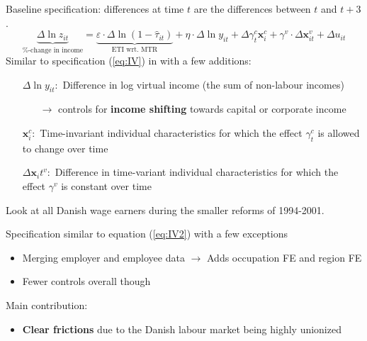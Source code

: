 \documentclass[8pt]{beamer}
\begin{document}
\begin{frame}{\citet{kleven2014estimating}}
  Baseline specification: differences at time $t$ are the differences between $t$ and $t+3$.
  \begin{equation}
    \underbrace{\Delta\ln z_{it}}_\text{\%-change in income} = \underbrace{\varepsilon\cdot\Delta\ln(1-\hat{\tau}_{it})}_\text{ETI wrt. MTR} + \eta\cdot\Delta\ln y_{it} + \Delta\gamma_t^c \bm{x}_i^c + \gamma^v\cdot\Delta\bm{x}_{it}^v + \Delta u_{it}
    \label{eq:IV2}
  \end{equation}
  Similar to specification (\ref{eq:IV}) in \citep{gruber2002elasticity} with a few additions:
  \begin{itemize}
    \item[$\Delta \ln y_{it}:$] Difference in log virtual income (the sum of non-labour incomes)
    \begin{itemize}
      \item[$\rightarrow$] controls for \textbf{income shifting} towards capital or corporate income
    \end{itemize}
    \item[$\bm{x}_i^c:$] Time-invariant individual characteristics for which the effect $\gamma_t^c$ is allowed to change over time
    \item[$\Delta \bm{x}_it^v:$] Difference in time-variant individual characteristics for which the effect $\gamma^v$ is constant over time
  \end{itemize}
\end{frame}


\begin{frame}{\citet{chetty2011adjustment}}
  Look at all Danish wage earners during the smaller reforms of 1994-2001.

  Specification similar to equation (\ref{eq:IV2}) \citep{kleven2014estimating} with a few exceptions
  \begin{itemize}
    \item Merging employer and employee data $\rightarrow$ Adds occupation FE and region FE
    \item Fewer controls overall though
  \end{itemize}
  Main contribution:
  \begin{itemize}
    \item \textbf{Clear frictions} due to the Danish labour market being highly unionized
  \end{itemize}
\end{frame}
\end{document}
